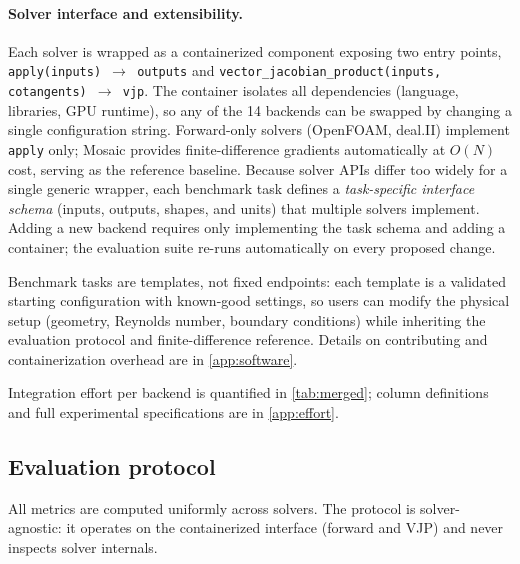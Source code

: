 \documentclass{article}
\begin{document}
\paragraph{Solver interface and extensibility.}
Each solver is wrapped as a containerized component exposing two entry points,
\texttt{apply(inputs)\,$\rightarrow$\,outputs} and
\texttt{vector\_jacobian\_product(inputs, cotangents)\,$\rightarrow$\,vjp}.
The container isolates all dependencies (language, libraries, GPU
runtime), so any of the 14 backends can be swapped by changing a single
configuration string.
Forward-only solvers
(OpenFOAM, deal.II) implement \texttt{apply} only; Mosaic provides
finite-difference gradients automatically at $O(N)$ cost, serving as the
reference baseline.
Because solver APIs differ too widely for a single generic wrapper, each
benchmark task defines a \emph{task-specific interface schema} (inputs,
outputs, shapes, and units) that multiple solvers implement. Adding a new
backend requires only implementing the task schema and adding a container;
the evaluation suite re-runs automatically on every proposed change.

Benchmark tasks are templates, not fixed endpoints: each template is a
validated starting configuration with known-good settings, so users can
modify the physical setup (geometry, Reynolds number, boundary conditions)
while inheriting the evaluation protocol and finite-difference reference.
Details on contributing and containerization overhead are in \cref{app:software}.

Integration effort per backend is quantified in \cref{tab:merged}; column
definitions and full experimental specifications are in \cref{app:effort}.

\subsection{Evaluation protocol}
\label{sec:protocol}

All metrics are computed uniformly across solvers. The protocol is
solver-agnostic: it operates on the containerized interface (forward and
VJP) and never inspects solver internals.
\end{document}
